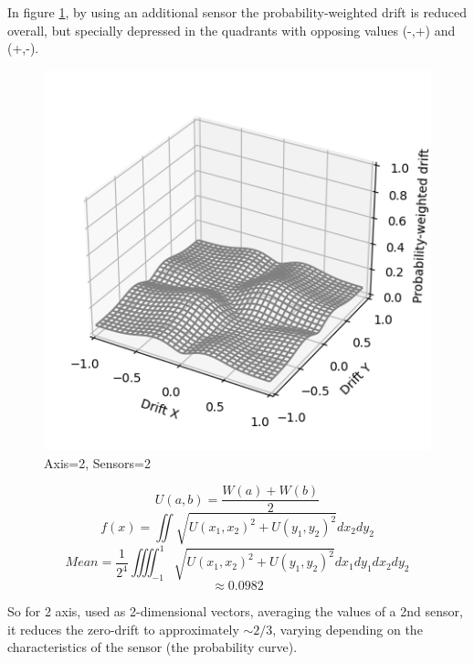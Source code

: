 \documentclass[10pt, twocolumn, a4paper]{article}
\begin{document}
            In figure \ref{fig_zero_22}, by using an additional sensor the probability-weighted drift is reduced overall, but specially depressed in the quadrants with opposing values (-,+) and (+,-).
            \begin{figure}[H]
                \begin{center}
                    \caption{Axis=2, Sensors=2}
                    \label{fig_zero_22}
                    \includegraphics[width=0.8\linewidth]{figure_drift_4.png}
                \end{center}
            \end{figure}
            \vspace{-8mm}
            $$ U(a, b) = \frac{W(a)+W(b)}{2} $$
            $$
                f(x) = \iint \sqrt{
                    U(x_1, x_2)^2 +
                    U(y_1, y_2)^2
                } dx_2 dy_2
            $$
            $$
                Mean = \frac{1}{2^4} \iiiint_{-1}^1 \sqrt{
                    U(x_1, x_2)^2 +
                    U(y_1, y_2)^2
                } dx_1 dy_1 dx_2 dy_2
            $$
            $$ \approx 0.0982 $$

            \pagebreak
            So for 2 axis, used as 2-dimensional vectors, averaging the values of a 2nd sensor, it reduces the zero-drift to approximately $ \sim 2/3 $, varying depending on the characteristics of the sensor (the probability curve).
\end{document}
